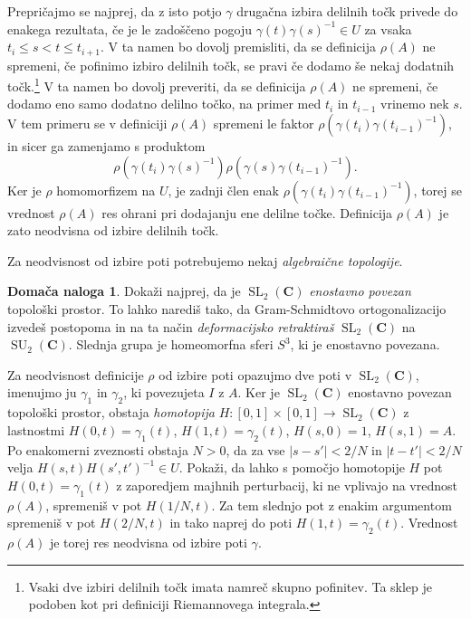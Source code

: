 \documentclass[11pt]{book}
\def\CC{\mathbf{C}}
\DeclareMathOperator\SU{SU}
\DeclareMathOperator\SL{SL}
\theoremstyle{definition}
\theoremstyle{zgled}
\theoremstyle{odprtproblem}
\theoremstyle{domacanaloga}
\newtheorem*{domacanaloga}{Domača naloga}
\theoremstyle{izrek}
\begin{document}
Prepričajmo se najprej, da z isto potjo $\gamma$ drugačna izbira delilnih točk privede do enakega rezultata, če je le zadoščeno pogoju $\gamma(t) \gamma(s)^{-1} \in U$ za vsaka $t_i \leq s < t \leq t_{i+1}$. V ta namen bo dovolj premisliti, da se definicija $\rho(A)$ ne spremeni, če pofinimo izbiro delilnih točk, se pravi če dodamo še nekaj dodatnih točk.\footnote{Vsaki dve izbiri delilnih točk imata namreč skupno pofinitev. Ta sklep je podoben kot pri definiciji Riemannovega integrala.} V ta namen bo dovolj preveriti, da se definicija $\rho(A)$ ne spremeni, če dodamo eno samo dodatno delilno točko, na primer med $t_i$ in $t_{i-1}$ vrinemo nek $s$. V tem primeru se v definiciji $\rho(A)$ spremeni le faktor $\rho(\gamma(t_i) \gamma(t_{i-1})^{-1})$, in sicer ga zamenjamo s produktom
\[
    \rho(\gamma(t_i) \gamma(s)^{-1}) 
    \rho(\gamma(s) \gamma(t_{i-1})^{-1}).
\]
Ker je $\rho$ homomorfizem na $U$, je zadnji člen enak $\rho(\gamma(t_i) \gamma(t_{i-1})^{-1})$, torej se vrednost $\rho(A)$ res ohrani pri dodajanju ene delilne točke. Definicija $\rho(A)$ je zato neodvisna od izbire delilnih točk.

Za neodvisnost od izbire poti potrebujemo nekaj \emph{algebraične topologije}.

\begin{domacanaloga}
Dokaži najprej, da je $\SL_2(\CC)$ \emph{enostavno povezan} topološki prostor. To lahko narediš tako, da Gram-Schmidtovo ortogonalizacijo izvedeš postopoma in na ta način \emph{deformacijsko retraktiraš} $\SL_2(\CC)$ na $\SU_2(\CC)$. Slednja grupa je homeomorfna sferi $S^3$, ki je enostavno povezana.

Za neodvisnost definicije $\rho$ od izbire poti opazujmo dve poti v $\SL_2(\CC)$, imenujmo ju $\gamma_1$ in $\gamma_2$, ki povezujeta $I$ z $A$. Ker je $\SL_2(\CC)$ enostavno povezan topološki prostor, obstaja \emph{homotopija} $H \colon [0,1] \times [0,1] \to \SL_2(\CC)$ z lastnostmi $H(0,t) = \gamma_1(t)$, $H(1,t) = \gamma_2(t)$, $H(s, 0) = 1$, $H(s,1) = A$. Po enakomerni zveznosti obstaja $N > 0$, da za vse $| s - s' | < 2/N$ in $| t - t'| < 2/N$ velja $H(s,t)H(s',t')^{-1} \in U$. Pokaži, da lahko s pomočjo homotopije $H$ pot $H(0,t) = \gamma_1(t)$ z zaporedjem majhnih perturbacij, ki ne vplivajo na vrednost $\rho(A)$, spremeniš v pot $H(1/N, t)$. Za tem slednjo pot z enakim argumentom spremeniš v pot $H(2/N, t)$ in tako naprej do poti $H(1,t) = \gamma_2(t)$. Vrednost $\rho(A)$ je torej res neodvisna od izbire poti $\gamma$.
\end{domacanaloga}
\end{document}
